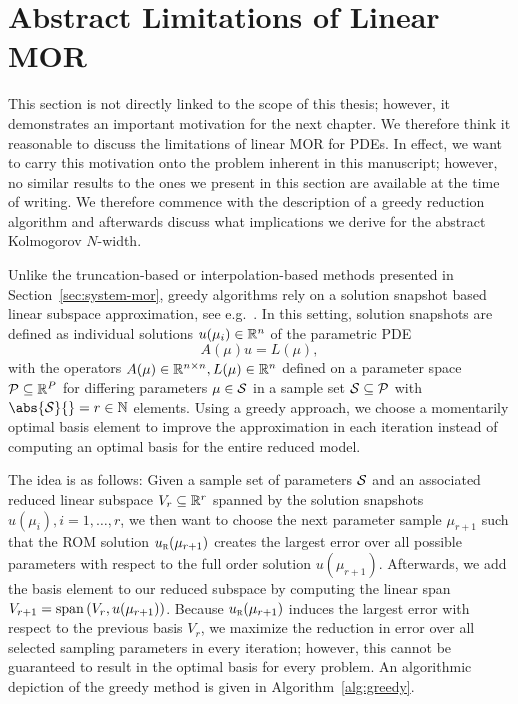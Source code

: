 \section{Abstract Limitations of Linear MOR}\label{sec:limitations-linear-mor}

This section is not directly linked to the scope of this thesis; however, it demonstrates an important motivation for the next chapter.
We therefore think it reasonable to discuss the limitations of linear MOR for \acp{PDE}.
In effect, we want to carry this motivation onto the problem inherent in this manuscript; however, no similar results to the ones we present in this section are available at the time of writing.
We therefore commence with the description of a greedy reduction algorithm and afterwards discuss what implications we derive for the abstract Kolmogorov $N$-width.

Unlike the truncation-based or interpolation-based methods presented in Section~\ref{sec:system-mor}, greedy algorithms rely on a solution snapshot based linear subspace approximation, see e.g.~\cite{Grepl2005, Rozza2008, Buffa2012}.
In this setting, solution snapshots are defined as individual solutions $u(\mu_i) \in \mathbb{R}^n$ of the parametric \ac{PDE}
\begin{equation}\label{eq:parametric-pde}
    A(\mu) u = L(\mu),
\end{equation}
with the operators $A(\mu) \in \mathbb{R}^{n \times n}, L(\mu) \in \mathbb{R}^n$ defined on a parameter space $\mathcal{P} \subseteq \mathbb{R}^P$ for differing parameters $\mu \in \mathcal{S}$ in a sample set $\mathcal{S} \subseteq \mathcal{P}$ with $\abs{\mcl{S}}{} = r \in \bb{N}$ elements.
Using a greedy approach, we choose a momentarily optimal basis element to improve the approximation in each iteration instead of computing an optimal basis for the entire reduced model.

The idea is as follows: Given a sample set of parameters $\mathcal{S}$ and an associated reduced linear subspace $V_r \subseteq \mathbb{R}^r$ spanned by the solution snapshots $u(\mu_i), i = 1, \dots, r$, we then want to choose the next parameter sample $\mu_{r + 1}$ such that the \ac{ROM} solution $u_{\textnormal{\scshape r}}(\mu_{r + 1})$ creates the largest error over all possible parameters with respect to the full order solution $u(\mu_{r + 1})$.
Afterwards, we add the basis element to our reduced subspace by computing the linear span $V_{r + 1} = \mathop{}\!\mathrm{span}\left(V_r, u(\mu_{r + 1})\right)$.
Because $u_{\textnormal{\scshape r}}(\mu_{r + 1})$ induces the largest error with respect to the previous basis $V_r$, we maximize the reduction in error over all selected sampling parameters in every iteration; however, this cannot be guaranteed to result in the optimal basis for every problem.
An algorithmic depiction of the greedy method is given in Algorithm~\ref{alg:greedy}.

